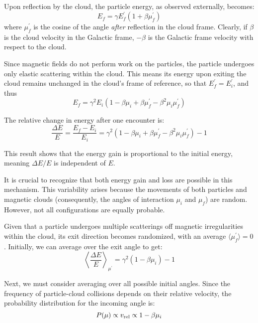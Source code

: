 Upon reflection by the cloud, the particle energy, as observed externally, becomes:
\begin{equation}
E_f  = \gamma E_f^\prime \left(1+ \beta \mu^\prime_f \right) 
\end{equation}
where \( \mu^\prime_f \) is the cosine of the angle \emph{after} reflection in the cloud frame. Clearly, if $\beta$ is the cloud velocity in the Galactic frame, $-\beta$ is the Galactic frame velocity with respect to the cloud.

Since magnetic fields do not perform work on the particles, the particle undergoes only elastic scattering within the cloud. This means its energy upon exiting the cloud remains unchanged in the cloud's frame of reference, so that \( E^\prime_f = E^\prime_i \), and thus
%
\begin{equation}
E_f = \gamma^2 E_i \left(1 - \beta \mu_i + \beta \mu^\prime_f - \beta^2 \mu_i \mu^\prime_f \right)
\end{equation}

The relative change in energy after one encounter is:
%
\begin{equation}
\frac{\Delta E}{E} = \frac{E_f - E_i}{E_i} =
\gamma^2  \left(1 - \beta \mu_i + \beta \mu^\prime_f - \beta^2 \mu_i \mu^\prime_f \right) - 1
\end{equation}

This result shows that the energy gain is proportional to the initial energy, meaning \( \Delta E/E \) is independent of \( E \).

It is crucial to recognize that both energy gain and loss are possible in this mechanism. This variability arises because the movements of both particles and magnetic clouds (consequently, the angles of interaction \( \mu_i \) and \( \mu_f \)) are random. 
%
However, not all configurations are equally probable.

Given that a particle undergoes multiple scatterings off magnetic irregularities within the cloud, its exit direction becomes randomized, with an average \( \langle \mu^\prime_f \rangle = 0 \). 
%
Initially, we can average over the exit angle to get:
%
\begin{equation}
\left\langle \frac{\Delta E}{E} \right\rangle_{\mu^\prime} = 
\gamma^2 \left( 1 - \beta \mu_i \right) - 1
\end{equation}

{\color{red}Next, we must consider averaging over all possible initial angles. Since the frequency of particle-cloud collisions depends on their relative velocity, the probability distribution for the incoming angle is:
\begin{equation}
P(\mu) \propto v_{\rm{rel}} \propto 1 - \beta \mu_i  
\end{equation}}

